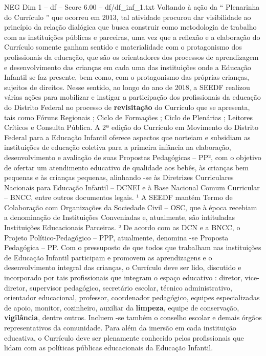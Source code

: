 \begin{textsample}{NEG Dim 1 – df – Score 6.00 – df/df\_inf\_1.txt}
Voltando à ação da “ Plenarinha do Currículo ” que ocorreu em 2013, tal atividade procurou dar visibilidade ao princípio da relação dialógica que busca construir como metodologia de trabalho com as instituições públicas e parceiras, uma vez que a reflexão e a elaboração do Currículo somente ganham sentido e materialidade com o protagonismo dos profissionais da educação, que são os orientadores dos processos de aprendizagem e desenvolvimento das crianças em cada uma das instituições onde a Educação Infantil se faz presente, bem como, com o protagonismo das próprias crianças, sujeitos de direitos.
Nesse sentido, ao longo do ano de 2018, a SEEDF realizou várias ações para mobilizar e instigar a participação dos profissionais da educação do Distrito Federal no processo de \textbf{revisitação} do Currículo que se apresenta, tais como Fóruns Regionais ; Ciclo de Formações ; Ciclo de Plenárias ; Leitores Críticos e Consulta Pública.
A 2ª edição do Currículo em Movimento do Distrito Federal para a Educação Infantil oferece aspectos que norteiam e subsidiam as instituições de educação coletiva para a primeira infância na elaboração, desenvolvimento e avaliação de suas Propostas Pedagógicas – PP², com o objetivo de ofertar um atendimento educativo de qualidade aos bebês, às crianças bem pequenas e às crianças pequenas, alinhando -se às Diretrizes Curriculares Nacionais para Educação Infantil – DCNEI e à Base Nacional Comum Curricular – BNCC, entre outros documentos legais. ¹ A SEEDF mantém Termo de Colaboração com Organizações da Sociedade Civil – OSC, que à época recebiam a denominação de Instituições Conveniadas e, atualmente, são intituladas Instituições Educacionais Parceiras. ² De acordo com as DCN e a BNCC, o Projeto Político-Pedagógico – PPP, atualmente, denomina -se Proposta Pedagógica – PP.
Com o pressuposto de que todos que trabalham nas instituições de Educação Infantil participam e promovem as aprendizagens e o desenvolvimento integral das crianças, o Currículo deve ser lido, discutido e incorporado por tais profissionais que integram o espaço educativo : diretor, vice-diretor, supervisor pedagógico, secretário escolar, técnico administrativo, orientador educacional, professor, coordenador pedagógico, equipes especializadas de apoio, monitor, cozinheiro, auxiliar da \textbf{limpeza}, equipe de conservação, \textbf{vigilância}, dentre outros.
Incluem -se também o conselho escolar e demais órgãos representativos da comunidade.
Para além da imersão em cada instituição educativa, o Currículo deve ser plenamente conhecido pelos profissionais que lidam com as políticas públicas educacionais da Educação Infantil.

\end{textsample}
